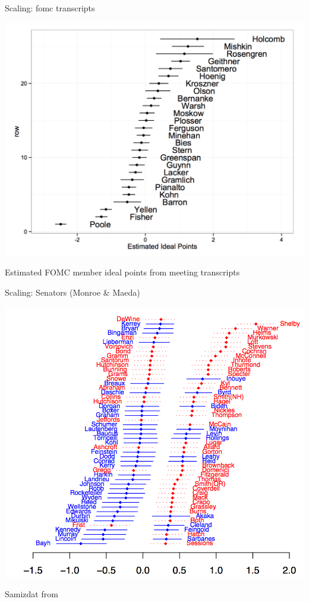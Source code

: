 \documentclass{hertieteaching}
\begin{document}
\begin{frame}{Scaling: fomc transcripts}

\centerline{\includegraphics[scale=0.35]{pictures/fomc-ip}}
Estimated FOMC member ideal points from meeting transcripts  \parencite{Baerg.Lowe2020}

\end{frame}

\begin{frame}{Scaling: Senators (Monroe \& Maeda)}

\centerline{\includegraphics[scale=0.25]{pictures/senator-ip-monroe-maeda} }
Samizdat from \parencite{Monroe.Maeda2004}

\end{frame}
\end{document}
